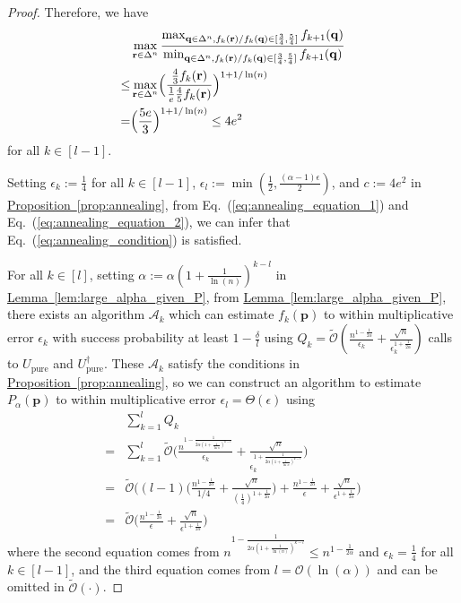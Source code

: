 \documentclass[journal]{IEEEtran}
\newcommand{\eq}[1]{Eq.~(\ref{eq:#1})}
\newcommand{\lem}[1]{\hyperref[lem:#1]{Lemma~\ref*{lem:#1}}}
\newcommand{\prop}[1]{\hyperref[prop:#1]{Proposition~\ref*{prop:#1}}}
\begin{document}
\begin{proof}
Therefore, we have
\begin{align}
\label{eq:annealing_equation_2}
&\max_{\mathbf{r} \in \Delta^n}\frac{\max_{\mathbf{q}\in \Delta^n, f_k(\mathbf{r})/f_k(\mathbf{q})\in [\frac{3}{4}, \frac{5}{4}]} f_{k+1}(\mathbf{q}) }{\min_{\mathbf{q}\in \Delta^n, f_k(\mathbf{r})/f_k(\mathbf{q})\in [\frac{3}{4}, \frac{5}{4}]} f_{k+1}(\mathbf{q})} \nonumber \\
\le & \max_{\mathbf{r} \in \Delta^n} \Bigl(\frac{\frac{4}{3}f_k(\mathbf{r})}{\frac{1}{e}\frac{4}{5}f_k(\mathbf{r})}\Bigr)^{1+1/\ln(n)} \\
= & \Bigl(\frac{5e}{3}\Bigr)^{1+1/\ln(n)} \le 4e^2
\end{align}
for all $k \in [l-1]$.

Setting $\epsilon_k := \frac{1}{4}$ for all $k \in[l-1]$, $\epsilon_l := \min(\frac{1}{2},\frac{(\alpha-1)\epsilon}{2})$, and $c:=4e^2$ in \prop{annealing}, from \eq{annealing_equation_1} and \eq{annealing_equation_2}, we can infer that \eq{annealing_condition} is satisfied.

For all $k\in[l]$, setting $\alpha:=\alpha(1+\frac{1}{\ln(n)})^{k-l}$ in \lem{large_alpha_given_P}, from  \lem{large_alpha_given_P}, there exists an algorithm $\mathcal{A}_k$ which can estimate $f_k(\mathbf{p})$ to within multiplicative error $\epsilon_k$ with success probability at least $1-\frac{\delta}{l}$ using $Q_k = \widetilde{\mathcal{O}}\left(\frac{n^{1-\frac{1}{2\alpha}}}{\epsilon_k} + \frac{\sqrt{n}}{\epsilon_k^{1+\frac{1}{2\alpha}}}\right)$ calls to $U_{\mathrm{pure}}$ and $U_{\mathrm{pure}}^{\dagger}$. These $\mathcal{A}_k$ satisfy the conditions in \prop{annealing}, so we can construct an algorithm to estimate $P_{\alpha}(\mathbf{p})$ to within multiplicative error $\epsilon_l = \Theta(\epsilon)$ using
\begin{align}
    &\sum_{k=1}^l Q_k \nonumber \\
    = & \sum_{k=1}^l \widetilde{\mathcal{O}}\biggl(\frac{n^{1-\frac{1}{2\alpha(1+\frac{1}{\ln n})^{k-l}}}}{\epsilon_k} + \frac{\sqrt{n}}{\epsilon_k^{1+\frac{1}{2\alpha(1+\frac{1}{\ln n})^{k-l}}}}\biggr) \nonumber\\
    = & \widetilde{\mathcal{O}}\biggl((l-1)\biggl(\frac{n^{1-\frac{1}{2\alpha}}}{1/4} + \frac{\sqrt{n}}{(\frac{1}{4})^{1+\frac{1}{2\alpha}}}\biggr) + \frac{n^{1-\frac{1}{2\alpha}}}{\epsilon} + \frac{\sqrt{n}}{\epsilon^{1+\frac{1}{2\alpha}}}\biggr)\nonumber\\
    = &\widetilde{\mathcal{O}}\biggl(\frac{n^{1-\frac{1}{2\alpha}}}{\epsilon} + \frac{\sqrt{n}}{\epsilon^{1+\frac{1}{2\alpha}}}\biggr)\label{eq:complexity-bound-large-alpha}
\end{align}
where the second equation comes from $n^{1-\frac{1}{2\alpha(1+\frac{1}{\ln(n)})^{k-l}}}\le n^{1-\frac{1}{2\alpha}}$ and $\epsilon_k = \frac{1}{4}$ for all $k\in[l-1]$, and the third equation comes from $l = \mathcal{O}(\ln(\alpha))$ and can be omitted in $\widetilde{\mathcal{O}}(\cdot)$.


\end{proof}
\end{document}
